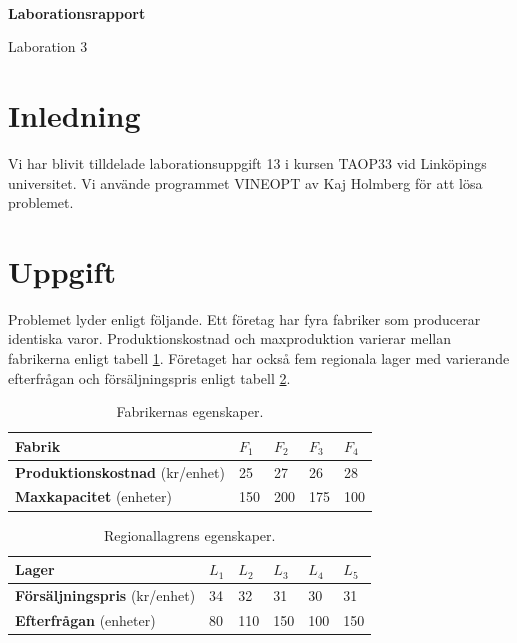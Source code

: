 \documentclass[titlepage, a4paper]{article}
\begin{document}
{\ }\vspace{3mm}

\begin{center}
  \huge \textbf{Laborationsrapport}
\end{center}
\begin{center}
\Large Laboration 3
\end{center}

\vspace{10mm}

\section{Inledning}

Vi har blivit tilldelade laborationsuppgift 13 i kursen TAOP33 vid Linköpings universitet. Vi använde programmet VINEOPT av Kaj Holmberg för att lösa problemet.

\section{Uppgift}

Problemet lyder enligt följande.
Ett företag har fyra fabriker som producerar identiska varor. Produktionskostnad och maxproduktion varierar mellan fabrikerna enligt tabell \ref{fabrik-egenskaper}. Företaget har också fem regionala lager med varierande efterfrågan och försäljningspris enligt tabell \ref{lager-egenskaper}.

\begin{table}[h!]
    \centering
    \begin{tabular}{ | l | l | l | l | l | }
        \hline
        {\textbf{Fabrik}} & {$F_{1}$} & {$F_{2}$} & {$F_{3}$} & {$F_{4}$} \\\hline
        {\textbf{Produktionskostnad} (kr/enhet)} & {25} & {27} & {26} & {28} \\\hline
        {\textbf{Maxkapacitet} (enheter)} & {150} & {200} & {175} & {100} \\\hline
    \end{tabular}
    \caption{Fabrikernas egenskaper.} \label{fabrik-egenskaper}
\end{table}

\begin{table}[h!]
    \centering
    \begin{tabular}{ | l | l | l | l | l | l | }
        \hline
        {\textbf{Lager}} & {$L_{1}$} & {$L_{2}$} & {$L_{3}$} & {$L_{4}$} & {$L_{5}$} \\\hline
        {\textbf{Försäljningspris} (kr/enhet)} & {34} & {32} & {31} & {30} & {31} \\\hline
        {\textbf{Efterfrågan} (enheter)} & {80} & {110} & {150} & {100} & {150} \\\hline
    \end{tabular}
    \caption{Regionallagrens egenskaper.} \label{lager-egenskaper}
\end{table}
\end{document}
